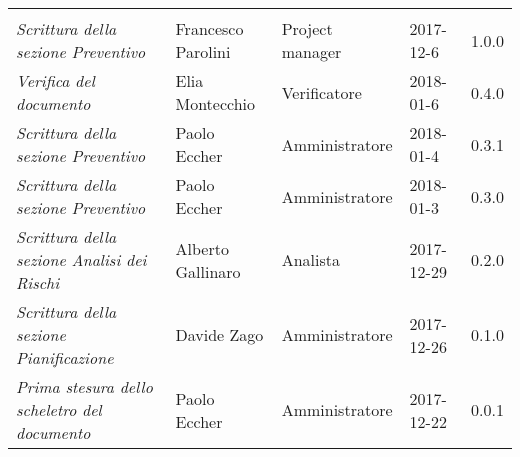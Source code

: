 \newpage 
\section*{}
\begin{table}[H]
	\centering
	\begin{tabular}{p{4cm}|C{3cm}|C{3cm}|R{2.5cm}|R{2cm}}
		
		 & & & & \\
		
		
		\emph{Scrittura della sezione Preventivo} & Francesco Parolini & Project manager & 2017-12-6 & 1.0.0\\
		\hline
		
		\emph{Verifica del documento} & Elia Montecchio & Verificatore & 2018-01-6 & 0.4.0 \\
		\hline
		
		\emph{Scrittura della sezione Preventivo} & Paolo Eccher & Amministratore & 2018-01-4 & 0.3.1 \\
		\hline
		
		\emph{Scrittura della sezione Preventivo} & Paolo Eccher & Amministratore & 2018-01-3 & 0.3.0 \\
		\hline
		
		\emph{Scrittura della sezione Analisi dei Rischi}& Alberto Gallinaro & Analista & 2017-12-29 & 0.2.0 \\
		\hline
		
		\emph{Scrittura della sezione Pianificazione}& Davide Zago & Amministratore & 2017-12-26 & 0.1.0 \\
		\hline
		
		\emph{Prima stesura dello scheletro del documento} & Paolo Eccher & Amministratore & 2017-12-22 & 0.0.1 \\
		
	\end{tabular}
	
\end{table}


\clearpage
